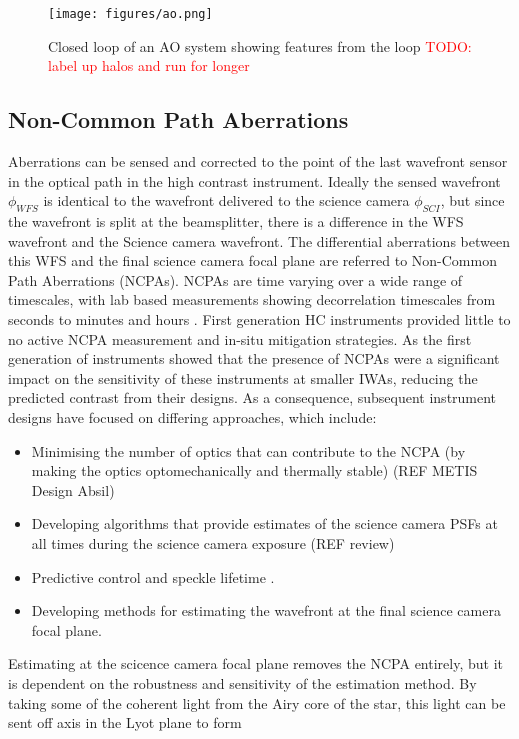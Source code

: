 \documentclass[letterpaper]{ar-1col}
\begin{document}
\begin{figure}[ht]
  \centering
  \texttt{[image: figures/ao.png]}
  \caption{Closed loop of an AO system showing features from the loop \textcolor{red}{TODO: label up halos and run for longer}}
  \label{fig:ao}
\end{figure}

\subsection{Non-Common Path Aberrations}

Aberrations can be sensed and corrected to the point of the last wavefront sensor in the optical path in the high contrast instrument.
%
Ideally the sensed wavefront $\phi_{WFS}$ is identical to the wavefront delivered to the science camera $\phi_{SCI}$, but since the wavefront is split at the beamsplitter, there is a difference in the WFS wavefront and the Science camera wavefront.
%
The differential aberrations between this WFS and the final science camera focal plane are referred to Non-Common Path Aberrations (NCPAs).
%
NCPAs are time varying over a wide range of timescales, with lab based measurements showing decorrelation timescales from seconds to minutes and hours \citep{Martinez12,Males21}.
%
First generation HC instruments provided little to no active NCPA measurement and in-situ mitigation strategies.
%
As the first generation of instruments showed that the presence of NCPAs were a significant impact on the sensitivity of these instruments at smaller IWAs, reducing the predicted contrast from their designs.
%
As a consequence, subsequent instrument designs have focused on differing  approaches, which include:

\begin{itemize}
    \item Minimising the number of optics that can contribute to the NCPA (by making the optics optomechanically and thermally stable) (REF METIS Design Absil)
    \item Developing algorithms that provide estimates of the science camera PSFs at all times during the science camera exposure (REF review)
    \item Predictive control and speckle lifetime \citep{Males18}.
    \item Developing methods for estimating the wavefront at the final science camera focal plane.
\end{itemize}

Estimating at the scicence camera focal plane removes the NCPA entirely, but it is dependent on the robustness and sensitivity of the estimation method.
%
By taking some of the coherent light from the Airy core of the star, this light can be sent off axis in the Lyot plane to form 
 
\end{document}

